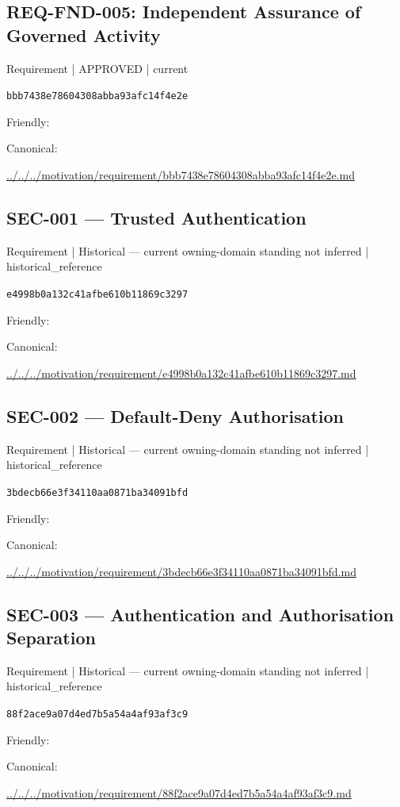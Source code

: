 \documentclass[10pt,a4paper]{article}
\begin{document}
\subsection*{REQ-FND-005: Independent Assurance of Governed Activity}
{\small Requirement | APPROVED | current}\par
\texttt{bbb7438e78604308abba93afc14f4e2e}\par
Friendly: \par
Canonical: \par
{\footnotesize\url{../../../motivation/requirement/bbb7438e78604308abba93afc14f4e2e.md}}\par
\subsection*{SEC-001 — Trusted Authentication}
{\small Requirement | Historical — current owning-domain standing not inferred | historical\_reference}\par
\texttt{e4998b0a132c41afbe610b11869c3297}\par
Friendly: \par
Canonical: \par
{\footnotesize\url{../../../motivation/requirement/e4998b0a132c41afbe610b11869c3297.md}}\par
\subsection*{SEC-002 — Default-Deny Authorisation}
{\small Requirement | Historical — current owning-domain standing not inferred | historical\_reference}\par
\texttt{3bdecb66e3f34110aa0871ba34091bfd}\par
Friendly: \par
Canonical: \par
{\footnotesize\url{../../../motivation/requirement/3bdecb66e3f34110aa0871ba34091bfd.md}}\par
\subsection*{SEC-003 — Authentication and Authorisation Separation}
{\small Requirement | Historical — current owning-domain standing not inferred | historical\_reference}\par
\texttt{88f2ace9a07d4ed7b5a54a4af93af3c9}\par
Friendly: \par
Canonical: \par
{\footnotesize\url{../../../motivation/requirement/88f2ace9a07d4ed7b5a54a4af93af3c9.md}}\par
\end{document}

